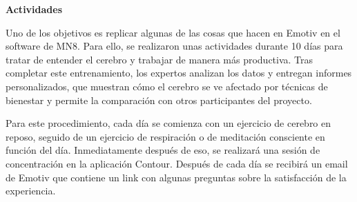 \textbf{Actividades}

Uno de los objetivos es replicar algunas de las cosas que hacen en Emotiv en el software de MN8. Para ello, se realizaron unas actividades durante 10 días para tratar de entender el cerebro y trabajar de manera más productiva. Tras completar este entrenamiento, los expertos analizan los datos y entregan informes personalizados, que muestran cómo el cerebro se ve afectado por técnicas de bienestar y permite la comparación con otros participantes del proyecto.

Para este procedimiento, cada día se comienza con un ejercicio de cerebro en reposo, seguido de un ejercicio de respiración o de meditación consciente en función del día. Inmediatamente después de eso, se realizará una sesión de concentración en la aplicación Contour. Después de cada día se recibirá un email de Emotiv que contiene un link con algunas preguntas sobre la satisfacción de la experiencia.

